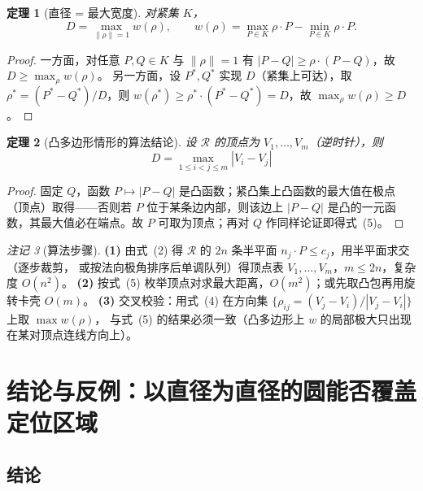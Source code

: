 \documentclass[11pt,a4paper]{ctexart}
\newtheorem{theorem}{定理}
\theoremstyle{definition}
\theoremstyle{remark}
\newtheorem{remark}[theorem]{注记}
\begin{document}
\begin{theorem}[直径 = 最大宽度]\label{thm:width}
对紧集 $K$，
\begin{equation}
D=\max_{\lVert\rho\rVert=1}w(\rho),\qquad
w(\rho)=\max_{P\in K}\rho\!\cdot P-\min_{P\in K}\rho\!\cdot P .
\tag{4}
\end{equation}
\end{theorem}

\begin{proof}
一方面，对任意 $P,Q\in K$ 与 $\lVert\rho\rVert=1$ 有 $|P-Q|\ge\rho\!\cdot(P-Q)$，故 $D\ge\max_\rho w(\rho)$。
另一方面，设 $P^*,Q^*$ 实现 $D$（紧集上可达），取 $\rho^*=(P^*-Q^*)/D$，则
$w(\rho^*)\ge\rho^*\!\cdot(P^*-Q^*)=D$，故 $\max_\rho w(\rho)\ge D$。
\end{proof}

\begin{theorem}[凸多边形情形的算法结论]\label{thm:vertex}
设 $\mathcal R$ 的顶点为 $V_1,\dots,V_m$（逆时针），则
\begin{equation}
\boxed{\ D=\max_{1\le i<j\le m}|V_i-V_j|\ }
\tag{5}
\end{equation}
\end{theorem}

\begin{proof}
固定 $Q$，函数 $P\mapsto|P-Q|$ 是凸函数；紧凸集上凸函数的最大值在极点（顶点）取得——否则若 $P$
位于某条边内部，则该边上 $|P-Q|$ 是凸的一元函数，其最大值必在端点。故 $P$ 可取为顶点；再对 $Q$
作同样论证即得式~(5)。
\end{proof}

\begin{remark}[算法步骤]
\textbf{(1)} 由式~(2) 得 $\mathcal R$ 的 $2n$ 条半平面 $n_j\!\cdot P\le c_j$，用半平面求交（逐步裁剪，
或按法向极角排序后单调队列）得顶点表 $V_1,\dots,V_m$，$m\le2n$，复杂度 $O(n^2)$。
\textbf{(2)} 按式~(5) 枚举顶点对求最大距离，$O(m^2)$；或先取凸包再用旋转卡壳 $O(m)$。
\textbf{(3)} 交叉校验：用式~(4) 在方向集 $\{\rho_{ij}=(V_j-V_i)/|V_j-V_i|\}$ 上取 $\max w(\rho)$，
与式~(5) 的结果必须一致（凸多边形上 $w$ 的局部极大只出现在某对顶点连线方向上）。
\end{remark}

\section{结论与反例：以直径为直径的圆能否覆盖定位区域}

\subsection{结论}
\end{document}
